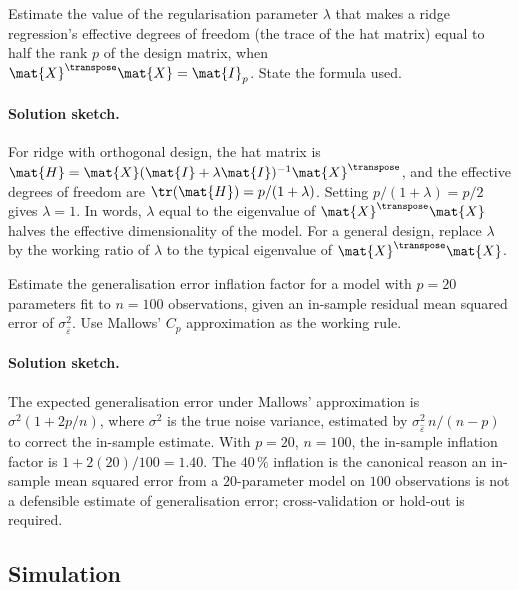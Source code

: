 \begin{exercise}
Estimate the value of the regularisation parameter $\lambda$ that
makes a ridge regression's effective degrees of freedom (the trace
of the hat matrix) equal to half the rank $p$ of the design
matrix, when $\mat{X}^{\transpose}\mat{X} = \mat{I}_{p}$. State the
formula used.

\paragraph{Solution sketch.} For ridge with orthogonal design,
the hat matrix is $\mat{H} = \mat{X}(\mat{I} + \lambda\mat{I})^{-1}
\mat{X}^{\transpose}$, and the effective degrees of freedom are
$\tr(\mat{H}) = p/(1 + \lambda)$. Setting $p/(1+\lambda) = p/2$
gives $\lambda = 1$. In words, $\lambda$ equal to the
eigenvalue of $\mat{X}^{\transpose}\mat{X}$ halves the effective
dimensionality of the model. For a general design, replace
$\lambda$ by the working ratio of $\lambda$ to the typical
eigenvalue of $\mat{X}^{\transpose}\mat{X}$.
\end{exercise}

\begin{exercise}
Estimate the generalisation error inflation factor for a model
with $p = 20$ parameters fit to $n = 100$ observations, given an
in-sample residual mean squared error of $\sigma^{2}_{\hat{\varepsilon}}$.
Use Mallows' $C_{p}$ approximation as the working rule.

\paragraph{Solution sketch.} The expected generalisation error
under Mallows' approximation is $\sigma^{2}(1 + 2p/n)$, where
$\sigma^{2}$ is the true noise variance, estimated by
$\sigma^{2}_{\hat{\varepsilon}}\,n/(n-p)$ to correct the in-sample
estimate. With $p = 20$, $n = 100$, the in-sample inflation
factor is $1 + 2(20)/100 = 1.40$. The $40\,\%$ inflation is the
canonical reason an in-sample mean squared error from a
$20$-parameter model on $100$ observations is not a defensible
estimate of generalisation error; cross-validation or hold-out is
required.
\end{exercise}

\subsection*{Simulation}

